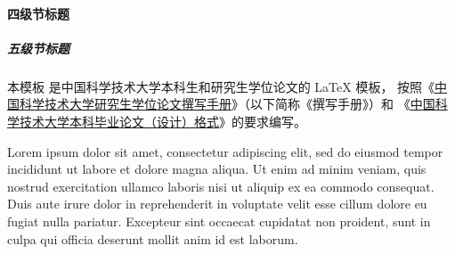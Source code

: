 \paragraph{四级节标题}

\subparagraph{五级节标题}

本模板  是中国科学技术大学本科生和研究生学位论文的 \LaTeX{}
模板， 按照《\href{https://gradschool.ustc.edu.cn/static/upload/article/picture/ce3b02e5f0274c90b9331ef50ae1ac26.pdf}
{中国科学技术大学研究生学位论文撰写手册}》（以下简称《撰写手册》）和
《\href{https://www.teach.ustc.edu.cn/?attachment_id=13867}
{中国科学技术大学本科毕业论文（设计）格式}》的要求编写。

Lorem ipsum dolor sit amet, consectetur adipiscing elit, sed do eiusmod tempor
incididunt ut labore et dolore magna aliqua.
Ut enim ad minim veniam, quis nostrud exercitation ullamco laboris nisi ut
aliquip ex ea commodo consequat.
Duis aute irure dolor in reprehenderit in voluptate velit esse cillum dolore eu
fugiat nulla pariatur.
Excepteur sint occaecat cupidatat non proident, sunt in culpa qui officia
deserunt mollit anim id est laborum.
